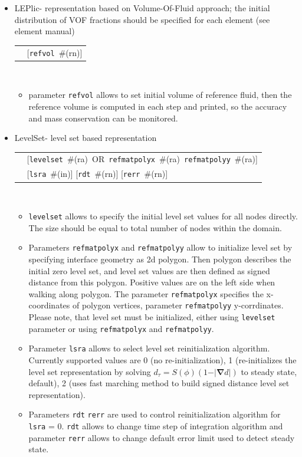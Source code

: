\documentclass[a4paper]{article}
\makeatletter
\newcommand{\grad}{\vect{\nabla}}
\newcommand{\vect}[1]{\boldsymbol{#1}} %
\newcommand{\param}[1]{\texttt{#1}} %
\newcommand{\optional}[1]{[#1]} %
\newcommand{\field}[2]{\param{#1}~\#{\tiny(#2)}} %
\newcommand{\optField}[2]{\optional{\field{#1}{#2}}}
\newenvironment{record}[1][]{\begin{tabular}{|ll}}{\end{tabular}\\}
\newcommand{\recentry}[2]{{#1}&{#2}\\}
\newcounter{rcc}
\newenvironment{record}[1][\textwidth]{\setcounter{rcc}{0}\begin{tabular*}{#1}{|ll@{\extracolsep{\fill}}r}}{\end{tabular*}\\}
\newcommand{\recentry}[2]{\ifthenelse{\value{rcc}>0}{&$\backslash$ \\}{\setcounter{rcc}{1}}{#1}&{#2}}
\makeatother
\begin{document}
\begin{itemize}
\item LEPlic- representation based on Volume-Of-Fluid approach; the initial distribution of VOF fractions should be specified for each element (see element manual)\\
  \begin{record}[0.9\textwidth]
    \recentry{}{\optField{refvol}{rn}}
  \end{record}
\begin{itemize}
\item
parameter \param{refvol} allows to set initial volume of reference fluid, then the reference volume is computed in each step and printed, so the accuracy and mass conservation can be monitored.
\end{itemize}
\item
LevelSet- level set based representation\\
\begin{record}[0.9\textwidth]
  \recentry{}{\mbox{[\field{levelset}{ra} OR \field{refmatpolyx}{ra} \field{refmatpolyy}{ra}]}}
  \recentry{}{\optField{lsra}{in} \optField{rdt}{rn} \optField{rerr}{rn}}
\end{record}
\begin{itemize}
\item \param{levelset} allows to specify the initial level set values for all nodes directly. The size should be equal to total number of nodes within the domain.
\item Parameters \param{refmatpolyx} and \param{refmatpolyy} allow to initialize level set by specifying interface geometry as 2d polygon. Then polygon describes the initial zero level set, and level set values are then defined as signed distance from this polygon. Positive values are on the left side when walking along polygon. The parameter \param{refmatpolyx} specifies the x-coordinates of polygon vertices, parameter \param{refmatpolyy} y-corrdinates. Please note, that level set must be initialized, either using \param{levelset} parameter or using \param{refmatpolyx} and \param{refmatpolyy}.
\item Parameter \param{lsra} allows to select level set reinitialization algorithm. Currently supported values are 0 (no re-initialization), 1 (re-initializes the level set representation by solving $d_{\tau} = S(\phi)(1-\vert\grad d\vert)$ to steady state, default), 2 (uses fast  marching method to build signed distance level set representation).
\item Parameters \param{rdt} \param{rerr} are used to control reinitialization algorithm for \param{lsra} = 0. \param{rdt} allows to change time step of integration algorithm and parameter \param{rerr} allows to change default error limit used to detect steady state.
\end{itemize}
\end{itemize}
\end{document}
